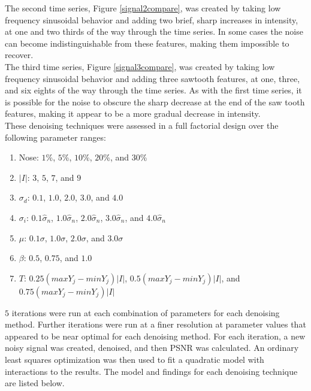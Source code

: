 \documentclass[11pt]{article}
\theoremstyle{definition}
\begin{document}
The second time series, Figure \ref{signal2compare}, was created by taking low frequency sinusoidal behavior and adding two brief, sharp increases in intensity, at one and two thirds of the way through the time series. In some cases the noise can become indistinguishable from these features, making them impossible to recover.\\

The third time series, Figure \ref{signal3compare}, was created by taking low frequency sinusoidal behavior and adding three sawtooth features, at one, three, and six eights of the way through the time series. As with the first time series, it is possible for the noise to obscure the sharp decrease at the end of the saw tooth features, making it appear to be a more gradual decrease in intensity.\\

These denoising techniques were assessed in a full factorial design over the following parameter ranges:

\begin{enumerate}

\item Nose: $1$\%, $5$\%, $10$\%, $20$\%, and $30$\%

\item $\lvert I \rvert$: $3$, $5$, $7$, and $9$

\item $\sigma_d$: $0.1$, $1.0$, $2.0$, $3.0$, and $4.0$

\item $\sigma_i$: $0.1 \hat{\sigma}_n$, $1.0 \hat{\sigma}_n$, $2.0 \hat{\sigma}_n$, $3.0 \hat{\sigma}_n$,  and $4.0 \hat{\sigma}_n$

\item $\mu$: $0.1 \sigma$, $1.0 \sigma$, $2.0 \sigma$, and $3.0 \sigma$

\item $\beta$: $0.5$, $0.75$, and $1.0$

\item $T$: $0.25 \left( max Y_j - min Y_j \right) \lvert I \rvert$, $0.5 \left( max Y_j - min Y_j \right) \lvert I \rvert$, and $0.75 \left( max Y_j - min Y_j \right) \lvert I \rvert$

\end{enumerate}

$5$ iterations were run at each combination of parameters for each denoising method. Further iterations were run at a finer resolution at parameter values that appeared to be near optimal for each denoising method. For each iteration, a new noisy signal was created, denoised, and then PSNR was calculated. An ordinary least squares optimization was then used to fit a quadratic model with interactions to the results. The model and findings for each denoising technique are listed below. 
\end{document}
